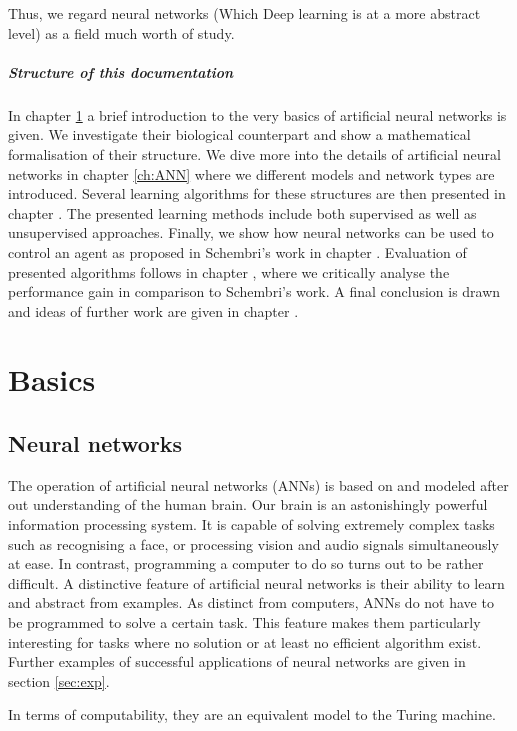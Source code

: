 \documentclass[10pt,a4paper,DIV=11]{scrreprt}
\begin{document}
Thus, we regard neural networks (Which Deep learning is at a more abstract level) as a field much worth of study.

\paragraph{Structure of this documentation}
In chapter \ref{ch:basics} a brief introduction to the very basics of artificial neural networks is given. We investigate their biological counterpart
and show a mathematical formalisation of their structure. We dive more into the details of artificial neural networks in chapter \ref{ch:ANN} where
we different models and network types are introduced. Several learning algorithms for these structures are then presented in chapter \label{ch:learning}. 
The presented learning methods include both supervised as well as unsupervised approaches. Finally, we show how neural networks can be used to 
control an agent as proposed in Schembri's work in chapter \label{ch:design}. Evaluation of presented algorithms follows in chapter \label{ch:eval}, 
where we critically analyse the performance gain in comparison to Schembri's work. A final conclusion is drawn and ideas of further work are given
in chapter \label{ch:conclusion}.

\chapter{Basics}
\label{ch:basics}
\section{Neural networks}
The operation of artificial neural networks (ANNs) is based on and modeled after out understanding of the human brain. 
Our brain is an astonishingly powerful information processing system. It is capable of solving extremely complex tasks such as recognising a face, or
processing vision and audio signals simultaneously at ease. In contrast, programming a computer to do so turns out to be rather difficult.
A distinctive feature of artificial neural networks is their ability to learn and abstract from examples. As distinct from computers, 
ANNs do not have to be programmed to solve a certain task. This feature makes them particularly interesting for tasks where no solution or at 
least no efficient algorithm exist. Further examples of successful applications of neural networks are given in section \ref{sec:exp}.


In terms of computability, they are an equivalent model to the Turing machine.\cite{NURING}
\end{document}
